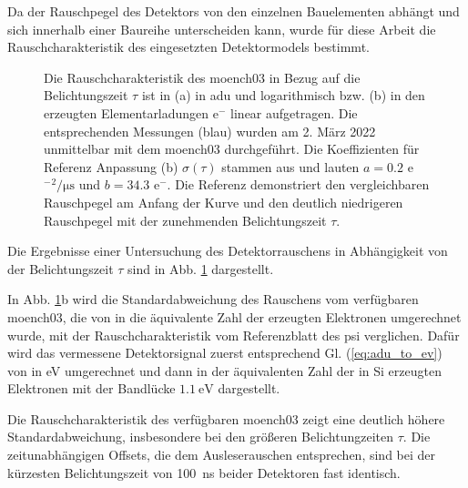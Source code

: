 \noindent
Da der Rauschpegel des Detektors von den einzelnen Bauelementen abhängt und sich innerhalb einer Baureihe unterscheiden kann, wurde für diese Arbeit die  Rauschcharakteristik des eingesetzten Detektormodels bestimmt.
\begin{figure}[H]
    \centering
    
    \caption{Die Rauschcharakteristik des \gls{moench03} in Bezug auf die Belichtungszeit $\tau$ ist in (a) in \gls{adu} und logarithmisch bzw. (b) in den erzeugten Elementarladungen e$^-$ linear aufgetragen. Die entsprechenden Messungen (blau) wurden am 2. März 2022 unmittelbar mit dem \gls{moench03} durchgeführt. Die Koeffizienten für Referenz Anpassung (b) $\sigma(\tau)$ stammen aus \cite{ramilli-measurements-2017} und lauten $a=\num{0,2}$ e${^-}^2\si{\per\micro\second}$ und $b=\num{34.3}$ e${^-}$. Die Referenz demonstriert den vergleichbaren Rauschpegel am Anfang der Kurve und den deutlich niedrigeren Rauschpegel mit der zunehmenden Belichtungszeit $\tau$.}
    \label{fig:noise_moench}
\end{figure}
\noindent
Die Ergebnisse einer Untersuchung des Detektorrauschens in Abhängigkeit von der Belichtungszeit $\tau$ sind in Abb. \ref{fig:noise_moench} dargestellt.

\noindent
In Abb. \ref{fig:noise_moench}b wird die Standardabweichung des Rauschens vom verfügbaren \gls{moench03}, die von \si{\adu} in die äquivalente Zahl der erzeugten Elektronen umgerechnet wurde, mit der Rauschcharakteristik vom Referenzblatt \cite{ramilli-measurements-2017} des \gls{psi} verglichen. Dafür wird das vermessene Detektorsignal zuerst entsprechend Gl. (\ref{eq:adu_to_ev}) von \si{\adu} in \si{\eV} umgerechnet und dann in der äquivalenten Zahl der in Si erzeugten Elektronen mit der Bandlücke $\SI{1,1}{\eV}$ dargestellt.

\noindent
Die Rauschcharakteristik des verfügbaren \gls{moench03} zeigt eine deutlich höhere Standardabweichung, insbesondere bei den größeren Belichtungzeiten $\tau$. Die zeitunabhängigen Offsets, die dem Ausleserauschen entsprechen, sind bei der kürzesten Belichtungszeit von \SI{100}{\nano\second} beider Detektoren fast identisch.


